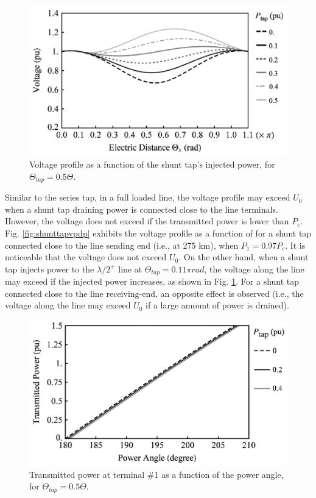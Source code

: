 \documentclass[12pt,a4paper]{reportmod}
\begin{document}
\begin{figure}[h]
\label{fig:shunttapvpip}
\begin{center}
\includegraphics[scale=0.3]{shunttapvpip.png}
\caption{Voltage profile as a function of the shunt tap’s injected power, for $\Theta_{tap}=0.5\Theta$.}
\end{center}
\end{figure}
\par Similar to the series tap, in a full loaded line, the voltage profile may exceed $U_0$ when a shunt tap draining power is connected close to the line terminals. However, the voltage does not exceed if the transmitted power is lower than $P_c$. Fig. \ref{fig:shunttapvpdp} exhibits the voltage profile as a function of for a shunt tap connected close to the line sending end (i.e., at 275 km), when $P_1=0.97P_c$. It is noticeable that the voltage does not exceed $U_0$. On the other hand, when a shunt tap injects power to the $\lambda /2^+$ line at $\Theta_{tap}=0.11\pi rad$, the voltage along the line may exceed if the injected power increases, as shown in Fig. \ref{fig:shunttapvpip}. For a shunt tap connected close to the line receiving-end, an opposite effect is observed (i.e., the voltage along the line may exceed $U_0$ if a large amount of power is drained).
\begin{figure}[H]
\label{fig:shunttaptppa}
\begin{center}
\includegraphics[scale=0.3]{shunttaptppa.png}
\caption{Transmitted power at terminal \#1 as a function of the power angle, for $\Theta_{tap}=0.5\Theta$.}
\end{center}
\end{figure}
\end{document}
